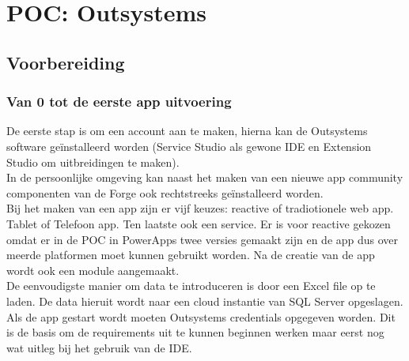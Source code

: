 
\chapter{POC: Outsystems}
\label{ch:outsystems-poc}



\section{Voorbereiding}

\subsection{Van 0 tot de eerste app uitvoering}

De eerste stap is om een account aan te maken, hierna kan de Outsystems software geïnstalleerd worden (Service Studio als gewone IDE en Extension Studio om uitbreidingen te maken).\\
In de persoonlijke omgeving kan naast het maken van een nieuwe app community componenten van de Forge ook rechtstreeks geïnstalleerd worden. \\
Bij het maken van een app zijn er vijf keuzes: reactive of tradiotionele web app. Tablet of Telefoon app. Ten laatste ook een service. Er is voor reactive gekozen omdat er in de POC in PowerApps twee versies gemaakt zijn en de app dus over meerde platformen moet kunnen gebruikt worden. Na de creatie van de app wordt ook een module aangemaakt.\\
De eenvoudigste manier om data te introduceren is door een Excel file op te laden. De data hieruit wordt naar een cloud instantie van SQL Server opgeslagen.\\
Als de app gestart wordt moeten Outsystems credentials opgegeven worden.
Dit is de basis om de requirements uit te kunnen beginnen werken maar eerst nog wat uitleg bij het gebruik van de IDE.

